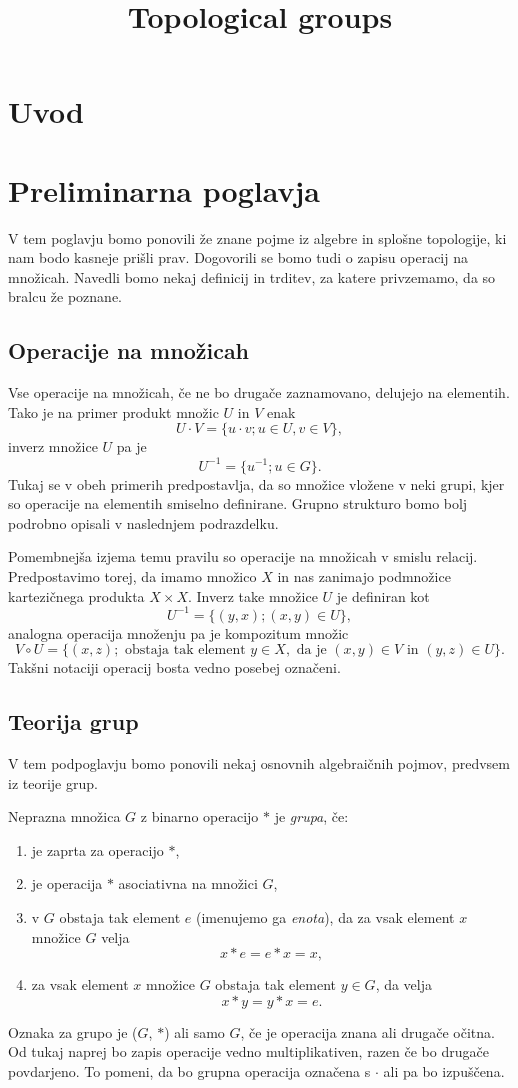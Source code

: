 \documentclass[mat1]{fmfdelo}
\title{Topological groups}
\begin{document}
\section{Uvod}

\section{Preliminarna poglavja}
V tem poglavju bomo ponovili že znane pojme iz algebre in splošne topologije, ki nam bodo kasneje prišli prav. Dogovorili se bomo tudi o zapisu operacij na množicah. Navedli bomo nekaj definicij in trditev, za katere privzemamo, da so bralcu že poznane.

\subsection{Operacije na množicah}\label{sec:opnamnozicah}
Vse operacije na množicah, če ne bo drugače za\-zna\-mo\-va\-no, delujejo na elementih. Tako je na primer produkt množic $U$ in $V$ enak \[U \cdot V = \lbrace u \cdot v ; u \in U, v \in V \rbrace, \] inverz množice $U$ pa je \[ U^{-1} = \lbrace u^{-1} ; u \in G \rbrace. \] Tukaj se v obeh primerih predpostavlja, da so množice vložene v neki grupi, kjer so operacije na elementih smiselno definirane. Grupno strukturo bomo bolj podrobno opisali v naslednjem podrazdelku.

Pomembnejša izjema temu pravilu so operacije na množicah v smislu relacij. Predpostavimo torej, da imamo množico $X$ in nas zanimajo podmnožice kartezičnega produkta $X \times X$. Inverz take množice $U$ je definiran kot \[ U^{-1} = \lbrace (y, x) ; (x, y) \in U \rbrace, \]
analogna operacija množenju pa je kompozitum množic \[ V \circ U = \lbrace (x, z) ; \text{ obstaja tak element } y \in X, \text{ da je } (x, y) \in V \text{ in } (y, z) \in U \rbrace. \]
Takšni notaciji operacij bosta vedno posebej označeni.

\subsection{Teorija grup}
V tem podpoglavju bomo ponovili nekaj osnovnih algebraičnih pojmov, predvsem iz teorije grup.

Neprazna množica $G$ z binarno operacijo $*$ je \emph{grupa}, če:
\begin{enumerate}
\item je zaprta za operacijo $*$,
\item je operacija $*$ asociativna na množici $G$,
\item v $G$ obstaja tak element $e$ (imenujemo ga \emph{enota}), da za vsak element $x$ množice $G$ velja \[ x*e = e*x = x, \]
\item za vsak element $x$ množice $G$ obstaja tak element $y \in G$, da velja \[ x*y = y*x = e. \]
\end{enumerate}
Oznaka za grupo je ($G$, $*$) ali samo $G$, če je operacija znana ali drugače očitna. Od tukaj naprej bo zapis operacije vedno multiplikativen, razen če bo drugače povdarjeno. To pomeni, da bo grupna operacija označena s $\cdot$ ali pa bo izpuščena.
\end{document}
